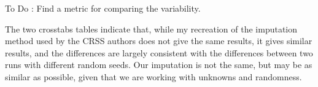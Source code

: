 \vskip 12pt

To Do :  Find a metric for comparing the variability.

\vskip 12pt

The two crosstabs tables indicate that, while my recreation of the imputation method used by the CRSS authors does not give the same results, it gives similar results, and the differences are largely consistent with the differences between two runs with different random seeds.  Our imputation is not the same, but may be as similar as possible, given that we are working with unknowns and randomness.













